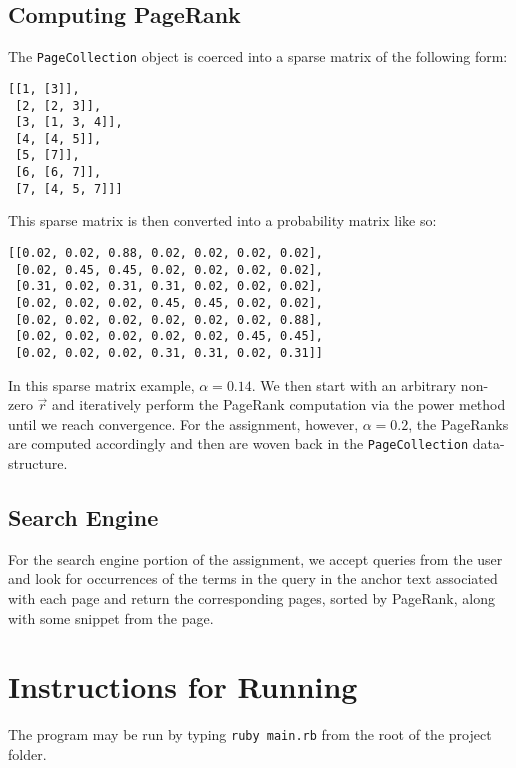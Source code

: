 \documentclass[12pt]{article}
\begin{document}
\subsection{Computing PageRank} %
\label{sub:computing_pagerank}
The \texttt{PageCollection} object is coerced into a sparse matrix of the following form:
\lstset{caption=This example actually corresponds to the link network example from the slides in class.}
\begin{lstlisting}
[[1, [3]], 
 [2, [2, 3]], 
 [3, [1, 3, 4]], 
 [4, [4, 5]], 
 [5, [7]], 
 [6, [6, 7]], 
 [7, [4, 5, 7]]]
\end{lstlisting}
This sparse matrix is then converted into a probability matrix like so:
\lstset{caption=Probability matrix corresponding to link network from class slides.}
\begin{lstlisting}
[[0.02, 0.02, 0.88, 0.02, 0.02, 0.02, 0.02],
 [0.02, 0.45, 0.45, 0.02, 0.02, 0.02, 0.02],
 [0.31, 0.02, 0.31, 0.31, 0.02, 0.02, 0.02],
 [0.02, 0.02, 0.02, 0.45, 0.45, 0.02, 0.02],
 [0.02, 0.02, 0.02, 0.02, 0.02, 0.02, 0.88],
 [0.02, 0.02, 0.02, 0.02, 0.02, 0.45, 0.45],
 [0.02, 0.02, 0.02, 0.31, 0.31, 0.02, 0.31]]
\end{lstlisting}
In this sparse matrix example, $\alpha=0.14$. We then start with an arbitrary non-zero $\vec{r}$ and iteratively perform the PageRank computation via the power method until we reach convergence. For the assignment, however, $\alpha=0.2$, the PageRanks are computed accordingly and then are woven back in the \texttt{PageCollection} data-structure.
\subsection{Search Engine} %
\label{sub:search_engine}
For the search engine portion of the assignment, we accept queries from the user and look for occurrences of the terms in the query in the anchor text associated with each page and return the corresponding pages, sorted by PageRank, along with some snippet from the page.
\section{Instructions for Running} %
\label{sec:instructions_for_running}
The program may be run by typing \texttt{ruby main.rb} from the root of the project folder. 
\end{document}
